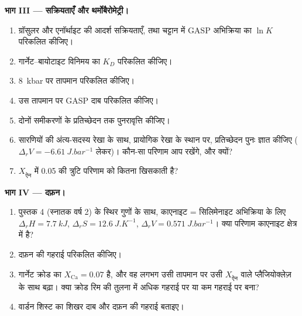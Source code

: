 \begin{problem}[{सप्ताहांत समस्या --- एक काल्पनिक शिस्ट का दाब और तापमान,
सारणियों, प्रावस्था नियम, सक्रियता मॉडल और
थर्मोबैरोमेट्री से}]
\medskip\noindent\textbf{भाग III --- सक्रियताएँ और थर्मोबैरोमेट्री।}
\begin{enumerate}[resume]
  \item ग्रॉसुलर और एनॉर्थाइट की आदर्श सक्रियताएँ, तथा चट्टान में GASP अभिक्रिया का
        $\ln K$ परिकलित कीजिए।
  \item गार्नेट--बायोटाइट विनिमय का $K_D$ परिकलित कीजिए।
  \item \qty{8}{kbar} पर तापमान परिकलित कीजिए।
  \item उस तापमान पर GASP दाब परिकलित कीजिए।
  \item दोनों समीकरणों के प्रतिच्छेदन तक पुनरावृत्ति कीजिए।
  \item सारणियों की अंत्य-सदस्य रेखा के साथ, प्रायोगिक रेखा के स्थान पर, प्रतिच्छेदन
        पुनः ज्ञात कीजिए ($\Delta_rV = \qty{-6.61}{J.bar^{-1}}$ लेकर)।
        कौन-सा परिणाम आप रखेंगे, और क्यों?
  \item $X_{\text{ऐन}}$ में 0.05 की त्रुटि परिणाम को कितना
        खिसकाती है?
\end{enumerate}

\medskip\noindent\textbf{भाग IV --- दफ़न।}
\begin{enumerate}[resume]
  \item पुस्तक 4 (स्नातक वर्ष 2) के स्थिर गुणों के साथ, काएनाइट = सिलिमेनाइट
        अभिक्रिया के लिए $\Delta_rH = \qty{7.7}{kJ}$, $\Delta_rS =
        \qty{12.6}{J.K^{-1}}$, $\Delta_rV = \qty{0.571}{J.bar^{-1}}$। क्या
        परिणाम काएनाइट क्षेत्र में है?
  \item दफ़न की गहराई परिकलित कीजिए।
  \item गार्नेट क्रोड का $X_{\text{Ca}} = 0.07$ है, और वह लगभग उसी तापमान पर
        उसी $X_{\text{ऐन}}$ वाले प्लैजियोक्लेज़ के साथ बढ़ा। क्या क्रोड
        रिम की तुलना में अधिक गहराई पर या कम गहराई पर बना?
  \item वार्डन शिस्ट का शिखर दाब और दफ़न की गहराई बताइए।
\end{enumerate}
\end{problem}
